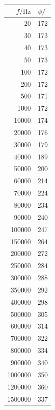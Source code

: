 \documentclass[]{scrartcl}
\begin{document}
\begin{table}[H]
	\centering
	\label{tab:phase}
	\hskip-1.50cm
	\begin{tabular}{r r}
		\toprule
		$f / \si{\hertz}$ & $\phi / ^{\circ}$ \\
		\midrule
		20	&	172	\\
		30	&	173	\\
		40	&	173	\\
		50	&	173	\\
		100	&	172	\\
		200	&	172	\\
		500	&	171	\\
		1000	&	172	\\
		10000	&	174	\\
		20000	&	176	\\
		30000	&	179	\\
		40000	&	189	\\
		50000	&	200	\\
		60000	&	214	\\
		70000	&	224	\\
		80000	&	234	\\
		90000	&	240	\\
		100000	&	247	\\
		150000	&	264	\\
		200000	&	272	\\
		250000	&	284	\\
		300000	&	288	\\
		350000	&	292	\\
		400000	&	298	\\
		500000	&	305	\\
		600000	&	314	\\
		700000	&	322	\\
		800000	&	334	\\
		900000	&	340	\\
		1000000	&	350	\\
		1200000	&	360	\\
		1500000	&	337	\\
		\bottomrule
	\end{tabular}
\end{table}
\end{document}
